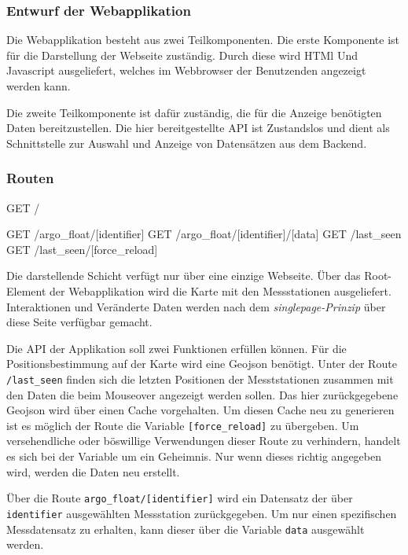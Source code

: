 \subsubsection{Entwurf der Webapplikation}

Die Webapplikation besteht aus zwei Teilkomponenten. Die erste Komponente ist für die Darstellung der Webseite zuständig. Durch diese wird HTMl Und Javascript ausgeliefert, welches im Webbrowser der Benutzenden angezeigt werden kann.

Die zweite Teilkomponente ist dafür zuständig, die für die Anzeige benötigten Daten bereitzustellen. Die hier bereitgestellte API ist Zustandslos und dient als Schnittstelle zur Auswahl und Anzeige von Datensätzen aus dem Backend. 

\subsubsection{Routen}

\begin{python}
GET     /

GET     /argo_float/[identifier]
GET     /argo_float/[identifier]/[data]
GET     /last_seen
GET     /last_seen/[force_reload]
\end{python}


Die darstellende Schicht verfügt nur über eine einzige Webseite. Über das Root-Element der Webapplikation wird die Karte mit den Messstationen ausgeliefert. Interaktionen und Veränderte Daten werden nach dem \textit{singlepage-Prinzip} über diese Seite verfügbar gemacht.

Die API der Applikation soll zwei Funktionen erfüllen können. Für die Positionsbestimmung auf der Karte wird eine Geojson benötigt. Unter der Route \texttt{/last\_seen} finden sich die letzten Positionen der Mesststationen zusammen mit den Daten die beim Mouseover angezeigt werden sollen. Das hier zurückgegebene Geojson wird über einen Cache vorgehalten. Um diesen Cache neu zu generieren ist es möglich der Route die Variable \texttt{[force\_reload]} zu übergeben. Um versehendliche oder böswillige Verwendungen dieser Route zu verhindern, handelt es sich bei der Variable um ein Geheimnis. Nur wenn dieses richtig angegeben wird, werden die Daten neu erstellt.

Über die Route \texttt{argo\_float/[identifier]} wird ein Datensatz der über \texttt{identifier} ausgewählten Messstation zurückgegeben. Um nur einen spezifischen Messdatensatz zu erhalten, kann dieser über die Variable \texttt{data} ausgewählt werden.


